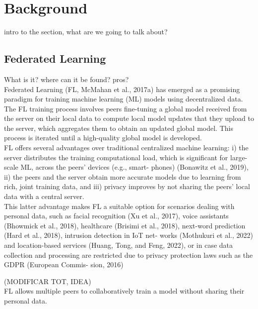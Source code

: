 \section{Background}
intro to the section, what are we going to talk about?
\subsection{Federated Learning}
What is it? where can it be found? pros?\\
\newline
Federated Learning (FL, McMahan et al., 2017a) has emerged as a promising 
paradigm for training machine learning (ML) models using decentralized data. \\
The FL training process involves peers fine-tuning a global model received from 
the server on their local data to compute local model updates that they upload to the 
server, which aggregates them to obtain an updated global model. This process is iterated 
until a high-quality global model is developed.\\
FL offers several advantages over traditional centralized machine learning: 
i) the server distributes the training computational load, which is significant for 
large-scale ML, across the peers’ devices (e.g., smart- phones) (Bonawitz et al., 2019), 
ii) the peers and the server obtain more accurate models due to learning from rich, joint 
training data, and iii) privacy improves by not sharing the peers’ local data with a 
central server.\\
This latter advantage makes FL a suitable option for scenarios
dealing with personal data, such as facial recognition (Xu et al., 2017), voice assistants
 (Bhowmick et al., 2018), healthcare (Brisimi et al., 2018), next-word prediction 
 (Hard et al., 2018), intrusion detection in IoT net- works (Mothukuri et al., 2022) 
 and location-based services (Huang, Tong, and Feng, 2022), or in case data collection and 
 processing are restricted due to privacy protection laws such as the GDPR 
 (European Commis- sion, 2016)

(MODIFICAR TOT, IDEA)\\

FL allows multiple peers to collaboratively train a model without sharing their 
personal data.

